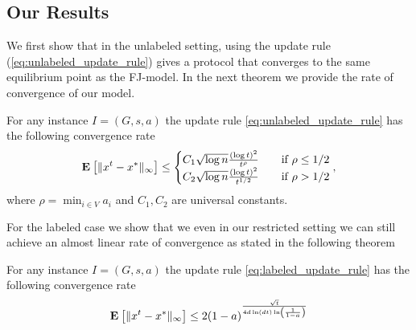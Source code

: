 \subsection{Our Results}
We first show that in the unlabeled setting, using the update rule
(\ref{eq:unlabeled_update_rule}) gives a protocol that converges to the
same equilibrium point as the FJ-model. In the next theorem we provide
the rate of convergence of our model.
\begin{theorem}
  For any instance $I = (G, s, a)$ the update rule \ref{eq:unlabeled_update_rule}
  has the following convergence rate
  \[
    \Exp{\norm{\infty}{x^t - x^*}} \leq
    \begin{cases}
      C_1 \sqrt{\log n}\frac{(\log t)^{2}}{t^\rho}
      &\quad\text{if } \rho \leq 1/2\\
      C_2 \sqrt{\log n}\frac{(\log t)^{2}}{t^{1/2}}
      &\quad\text{if } \rho > 1/2\\
    \end{cases},
  \]
  where $\rho = \min_{i \in V} a_i$ and $C_1, C_2$ are universal constants.
\end{theorem}

For the labeled case we show that we even in our restricted setting we can still
achieve an almost linear rate of convergence as stated in the following theorem

\begin{theorem}
  For any instance $I = (G, s, a)$ the update rule \ref{eq:labeled_update_rule}
  has the following convergence rate
  \[
    \Exp{\norm{\infty}{x^t -x^*}} \leq
    2(1-a)^{\frac{\sqrt{t}}{4d\ln(dt)\ln\lp( \frac{1}{1-a}\rp)}}
  \]
\end{theorem}



